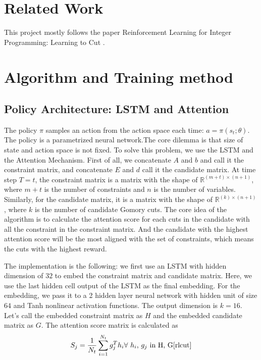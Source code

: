 \documentclass{article}
\begin{document}
\section{Related Work}
This project mostly follows the paper Reinforcement Learning for Integer Programming: Learning to Cut \cite{rlcut}.

\section{Algorithm and Training method}
\subsection{Policy Architecture: LSTM and Attention}

The policy $\pi$ samples an action from the action space each time: $a = \pi(s_t ; \theta)$. The policy is a parametrized neural network.The core dilemma is that size of state and action space is not fixed. To solve this problem, we use the LSTM\cite{lstm} and the Attention Mechanism\cite{attention1}\cite{attention2}. First of all, we concatenate $A$ and $b$ and call it the constraint matrix, and concatenate $E$ and $d$ call it the candidate matrix. At time step $T = t$, the constraint matrix is a matrix with the shape of $\mathbb{R} ^ {(m+t) \times (n+1)}$, where $m+t$ is the number of constraints and $n$ is the number of variables. Similarly, for the candidate matrix, it is a matrix with the shape of $\mathbb{R} ^ {(k) \times (n+1)}$, where $k$ is the number of candidate Gomory cuts. The core idea of the algorithm is to calculate the attention score for each cuts in the candidate with all the constraint in the constraint matrix.\cite{rlcut} And the candidate with the highest attention score will be the most aligned with the set of constraints, which means the cuts with the highest reward. 

The implementation is the following: we first use an LSTM with hidden dimension of $32$ to embed the constraint matrix and candidate matrix. Here, we use the last hidden cell output of the LSTM as the final embedding. For the embedding, we pass it to a 2 hidden layer neural network with hidden unit of size $64$ and Tanh nonlinear activation functions. The output dimension is $k = 16$. Let's call the embedded constraint matrix as $H$ and the embedded candidate matrix as $G$. The attention score matrix is calculated as
 \[S_j = \frac{1}{N_t}\sum_{i=1}^{N_t} g_j^Th_i \text{$\forall$ $h_i$, $g_j$ in H, G} \cite{rlcut}\]
 
\end{document}
